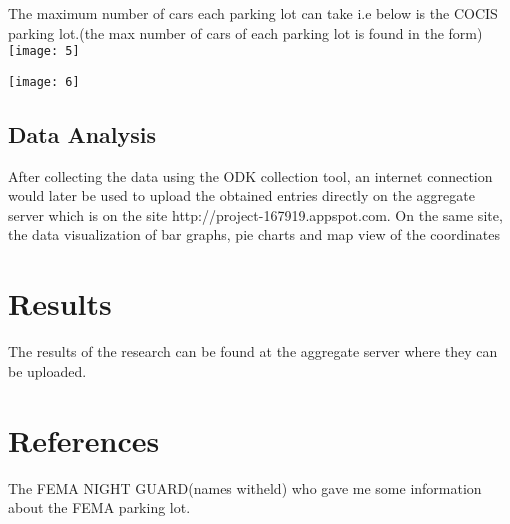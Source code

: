 \documentclass[18pt, a4paper]{article}
\begin{document}
	The maximum number of cars each parking lot can take i.e below is the COCIS parking lot.(the max number of cars of each parking lot is found in the form)\\
   
                         \texttt{[image: 5]}

                       \texttt{[image: 6]}

			\subsection{Data Analysis}

After collecting the data using the ODK collection tool, an internet connection would later be used to upload the obtained entries directly on the aggregate server which is on the site http://project-167919.appspot.com. On the same site, the data visualization of bar graphs, pie charts and map view of the coordinates \\

			
				\section{Results}

The results of the research can be found at the aggregate server where they can be uploaded.\\

			

		\section{References}
          The FEMA NIGHT GUARD(names witheld) who gave me some information about the FEMA parking lot.



			

				
	

	
\end{document}
